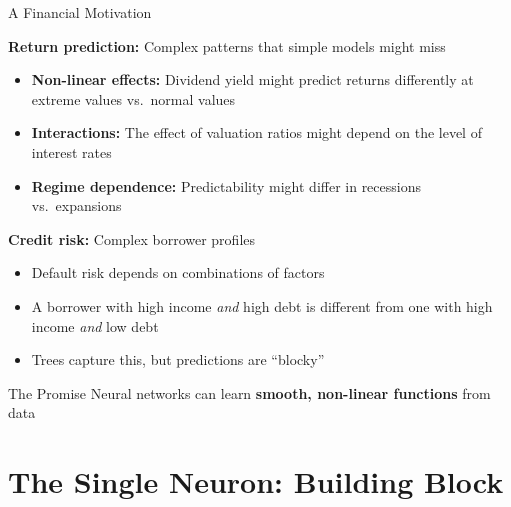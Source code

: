 \documentclass[10pt]{beamer}
\newcommand{\highlight}[1]{\textcolor{AccentOrange}{\textbf{#1}}}
\begin{document}
\begin{frame}{A Financial Motivation}

  \textbf{Return prediction:} Complex patterns that simple models might miss

  \vspace{0.5em}
  \begin{itemize}
    \item \textbf{Non-linear effects:} Dividend yield might predict returns differently at extreme values vs.\ normal values

    \vspace{0.3em}
    \item \textbf{Interactions:} The effect of valuation ratios might depend on the level of interest rates

    \vspace{0.3em}
    \item \textbf{Regime dependence:} Predictability might differ in recessions vs.\ expansions
  \end{itemize}

  \vspace{1em}
  \textbf{Credit risk:} Complex borrower profiles
  \begin{itemize}
    \item Default risk depends on combinations of factors
    \item A borrower with high income \textit{and} high debt is different from one with high income \textit{and} low debt
    \item Trees capture this, but predictions are ``blocky''
  \end{itemize}

  \vspace{0.5em}
  \begin{block}{The Promise}
    Neural networks can learn \highlight{smooth, non-linear functions} from data
  \end{block}
\end{frame}

\section{The Single Neuron: Building Block}
\end{document}
